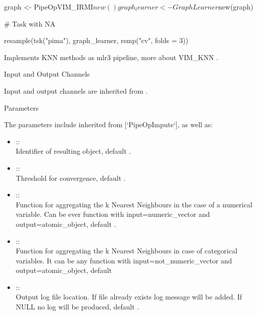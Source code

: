 \documentclass[letterpaper]{book}
\begin{document}
%
\begin{Examples}
\begin{ExampleCode}
{
  graph <- PipeOpVIM_IRMI$new() %
  graph_learner <- GraphLearner$new(graph)

  # Task with NA

  resample(tsk("pima"), graph_learner, rsmp("cv", folds = 3))
}
\end{ExampleCode}
\end{Examples}
%
\begin{Description}\relax
Implements KNN methods as mlr3 pipeline, more about VIM\_KNN .
\end{Description}
%
\begin{Section}{Input and Output Channels}

Input and output channels are inherited from .
\end{Section}
%
\begin{Section}{Parameters}

The parameters include inherited from [`PipeOpImpute`], as well as: \\{}
\begin{itemize}

\item{}  :: \\{}
Identifier of resulting object, default .
\item{}  :: \\{}
Threshold for convergence, default .
\item{}  :: \\{}
Function for aggregating the k Nearest Neighbours in the case of a numerical variable.  Can be ever function with input=numeric\_vector and output=atomic\_object, default .
\item{}  :: \\{}
Function for aggregating the k Nearest Neighbours in case of categorical variables. It can be any function with input=not\_numeric\_vector and output=atomic\_object, default 
\item{}  :: \\{}
Output log file location. If file already exists log message will be added. If NULL no log will be produced, default .

\end{itemize}

\end{Section}
\end{document}

